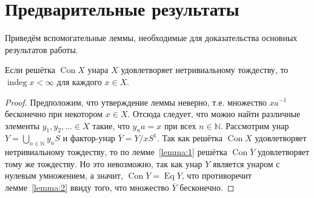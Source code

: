 \documentclass[11pt,twoside,final
]{article}
\def\Con{\operatorname{Con}}
\def\Eq{\operatorname{Eq}}
\def\indeg{\operatorname{indeg}}
\begin{document}
\section{Предварительные результаты}

Приведём вспомогательные леммы, необходимые для доказательства основных результатов работы.
\begin{lemma} \label{lemma:5}
	Если решётка $\Con X$ унара $X$ удовлетворяет нетривиальному тождеству, то $\indeg x < \infty$ для каждого $x \in X$.
\end{lemma}
\begin{proof}
	Предположим, что утверждение леммы неверно, т.е. множество $xa^{-1}$ бесконечно при некотором $x \in X$.
	Отсюда следует, что можно найти различные элементы $y_1, y_2, \ldots \in X $ такие, что $y_n a = x$ при всех $n \in \mathbb{N}$.
	Рассмотрим унар $Y = \bigcup_{n \in \mathbb{N}} y_n S$ и фактор-унар $\overline{Y} = Y / x S^1$.
	Так как решётка $\Con X$ удовлетворяет нетривиальному тождеству, то по лемме~\ref{lemma:1} решётка $\Con \overline{Y}$ удовлетворяет тому же тождеству.
	Но это невозможно, так как унар $Y$ является унаром с нулевым умножением, а значит, $\Con \overline{Y} = \Eq \overline{Y}$, что противоречит лемме~\ref{lemma:2} ввиду того, что множество $\overline{Y}$ бесконечно.
\end{proof}
\end{document}
